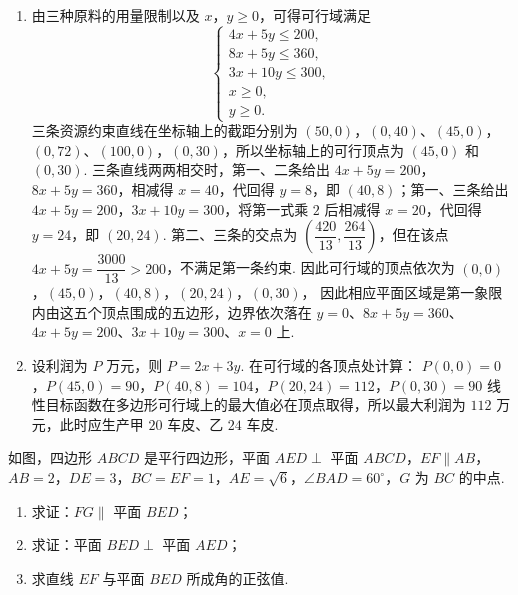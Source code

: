 \begin{solution}
\begin{enumerate}
\item 由三种原料的用量限制以及 \(x\)，\(y\geqslant0\)，可得可行域满足
\[
\begin{cases}
4x+5y\leqslant200,\\
8x+5y\leqslant360,\\
3x+10y\leqslant300,\\
x\geqslant0,\\
y\geqslant0.
\end{cases}
\]
三条资源约束直线在坐标轴上的截距分别为
\((50,0)\)，\((0,40)\)、\((45,0)\)，\((0,72)\)、\((100,0)\)，\((0,30)\)，所以坐标轴上的可行顶点为
\((45,0)\) 和 \((0,30)\). 三条直线两两相交时，第一、二条给出
\(4x+5y=200\)，\(8x+5y=360\)，相减得 \(x=40\)，代回得 \(y=8\)，即
\((40,8)\)；第一、三条给出
\(4x+5y=200\)，\(3x+10y=300\)，将第一式乘 \(2\) 后相减得 \(x=20\)，代回得 \(y=24\)，即
\((20,24)\). 第二、三条的交点为
\(\left(\dfrac{420}{13},\dfrac{264}{13}\right)\)，但在该点
\(4x+5y=\dfrac{3000}{13}>200\)，不满足第一条约束. 因此可行域的顶点依次为
\((0,0)\)，\((45,0)\)，\((40,8)\)，\((20,24)\)，\((0,30)\)，
因此相应平面区域是第一象限内由这五个顶点围成的五边形，边界依次落在
\(y=0\)、\(8x+5y=360\)、\(4x+5y=200\)、\(3x+10y=300\)、\(x=0\) 上.

\item 设利润为 \(P\) 万元，则
\(P=2x+3y\). 在可行域的各顶点处计算：
\(P(0,0)=0\)，\(P(45,0)=90\)，\(P(40,8)=104\)，\(P(20,24)=112\)，\(P(0,30)=90\)
线性目标函数在多边形可行域上的最大值必在顶点取得，所以最大利润为
\(112\) 万元，此时应生产甲 \(20\) 车皮、乙 \(24\) 车皮.
\end{enumerate}
\end{solution}

\begin{problem}
如图，四边形 \(ABCD\) 是平行四边形，平面 \( AED \perp \) 平面 \(ABCD\)，\( EF\parallel AB \)，\( AB=2 \)，\( DE=3 \)，\( BC=EF=1 \)，\( AE=\sqrt6 \)，\( \angle BAD=60^\circ \)，\(G\) 为 \(BC\) 的中点.

\begin{enumerate}
\item 求证：\( FG\parallel \) 平面 \(BED\)；
\item 求证：平面 \( BED \perp \) 平面 \(AED\)；
\item 求直线 \(EF\) 与平面 \(BED\) 所成角的正弦值.
\end{enumerate}

\FloatBarrier
\end{problem}

